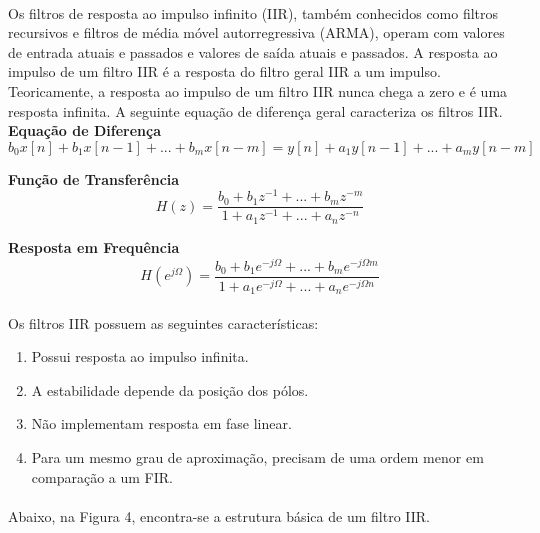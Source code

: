 \documentclass[12pt,fleqn]{article}
\begin{document}
\paragraph{} Os filtros de resposta ao impulso infinito (IIR), também conhecidos como filtros recursivos e filtros de média móvel autorregressiva (ARMA), operam com valores de entrada atuais e passados e valores de saída atuais e passados. A resposta ao impulso de um filtro IIR é a resposta do filtro geral IIR a um impulso. Teoricamente, a resposta ao impulso de um filtro IIR nunca chega a zero e é uma resposta infinita. A seguinte equação de diferença geral caracteriza os filtros IIR.\\

\textbf{Equação de Diferença}
\begin{equation}
b_0x[n] + b_1x[n-1] + ... + b_mx[n-m] = y[n] + a_1y[n-1] + ... + a_my[n-m]
\end{equation}

\textbf{Função de Transferência}
\begin{equation}
H(z) = \frac{b_0 + b_1z^{-1} + ... + b_mz^{-m}}{1 + a_1z^{-1} + ... + a_nz^{-n}}
\end{equation}

\textbf{Resposta em Frequência}
\begin{equation}
H(e^{j\Omega}) = \frac{b_0 + b_1e^{-j\Omega} + ... + b_me^{-j\Omega m}}{1 + a_1e^{-j\Omega} + ... + a_ne^{-j\Omega n}}
\end{equation}

\paragraph{} Os filtros IIR possuem as seguintes características:
\begin{enumerate}
    \item Possui resposta ao impulso infinita. 
    \item A estabilidade depende da posição dos pólos.
    \item Não implementam resposta em fase linear.
    \item Para um mesmo grau de aproximação, precisam de uma ordem menor em comparação a um FIR.
    \\
\end{enumerate}

\paragraph{} Abaixo, na Figura 4, encontra-se a estrutura básica de um filtro IIR.
\end{document}

